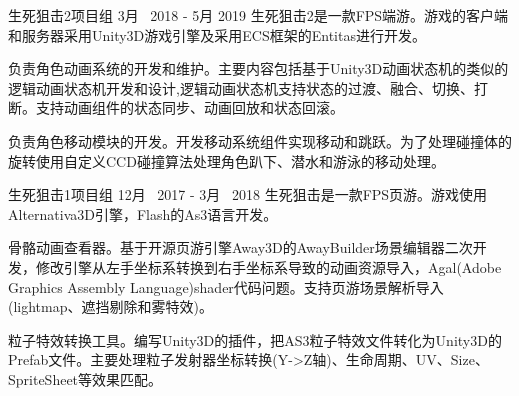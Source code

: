 \begin{cventries}
\cventryproject
{生死狙击2项目组} %
{3月~ 2018 - 5月 2019} %
{生死狙击2是一款FPS端游。游戏的客户端和服务器采用Unity3D游戏引擎及采用ECS框架的Entitas进行开发。}
{ %
\begin{cvitems}
\item {负责角色动画系统的开发和维护。主要内容包括基于Unity3D动画状态机的类似的逻辑动画状态机开发和设计,逻辑动画状态机支持状态的过渡、融合、切换、打断。支持动画组件的状态同步、动画回放和状态回滚。}
\item{负责角色移动模块的开发。开发移动系统组件实现移动和跳跃。为了处理碰撞体的旋转使用自定义CCD碰撞算法处理角色趴下、潜水和游泳的移动处理。}
\end{cvitems}
}

\cventryproject
{生死狙击1项目组} %
{12月~ 2017 - 3月~ 2018} %
{生死狙击是一款FPS页游。游戏使用Alternativa3D引擎，Flash的As3语言开发。}
{ %
	\begin{cvitems}
		\item {骨骼动画查看器。基于开源页游引擎Away3D的AwayBuilder场景编辑器二次开发，修改引擎从左手坐标系转换到右手坐标系导致的动画资源导入，Agal(Adobe Graphics Assembly Language)shader代码问题。支持页游场景解析导入(lightmap、遮挡剔除和雾特效)。}
		\item {粒子特效转换工具。编写Unity3D的插件，把AS3粒子特效文件转化为Unity3D的Prefab文件。主要处理粒子发射器坐标转换(Y->Z轴)、生命周期、UV、Size、SpriteSheet等效果匹配。}
	\end{cvitems}
}



\end{cventries}
